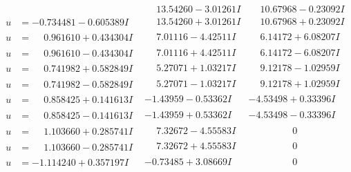 \documentclass[1p]{elsarticle_modified}
\theoremstyle{definition}
\begin{document}
$$\begin{array}{c|c|c}
 & \phantom{-}13.54260 - 3.01261 I & \phantom{-}10.67968 - 0.23092 I \\ \hline\begin{aligned}
u &= -0.734481 - 0.605389 I\end{aligned}
 & \phantom{-}13.54260 + 3.01261 I & \phantom{-}10.67968 + 0.23092 I \\ \hline\begin{aligned}
u &= \phantom{-}0.961610 + 0.434304 I\end{aligned}
 & \phantom{-}7.01116 - 4.42511 I & \phantom{-}6.14172 + 6.08207 I \\ \hline\begin{aligned}
u &= \phantom{-}0.961610 - 0.434304 I\end{aligned}
 & \phantom{-}7.01116 + 4.42511 I & \phantom{-}6.14172 - 6.08207 I \\ \hline\begin{aligned}
u &= \phantom{-}0.741982 + 0.582849 I\end{aligned}
 & \phantom{-}5.27071 + 1.03217 I & \phantom{-}9.12178 - 1.02959 I \\ \hline\begin{aligned}
u &= \phantom{-}0.741982 - 0.582849 I\end{aligned}
 & \phantom{-}5.27071 - 1.03217 I & \phantom{-}9.12178 + 1.02959 I \\ \hline\begin{aligned}
u &= \phantom{-}0.858425 + 0.141613 I\end{aligned}
 & -1.43959 - 0.53362 I & -4.53498 + 0.33396 I \\ \hline\begin{aligned}
u &= \phantom{-}0.858425 - 0.141613 I\end{aligned}
 & -1.43959 + 0.53362 I & -4.53498 - 0.33396 I \\ \hline\begin{aligned}
u &= \phantom{-}1.103660 + 0.285741 I\end{aligned}
 & \phantom{-}7.32672 - 4.55583 I & \phantom{-0.000000 } 0 \\ \hline\begin{aligned}
u &= \phantom{-}1.103660 - 0.285741 I\end{aligned}
 & \phantom{-}7.32672 + 4.55583 I & \phantom{-0.000000 } 0 \\ \hline\begin{aligned}
u &= -1.114240 + 0.357197 I\end{aligned}
 & -0.73485 + 3.08669 I & \phantom{-0.000000 } 0 \\ \hline\begin{aligned}

\end{aligned}
\end{array}$$
\end{document}

